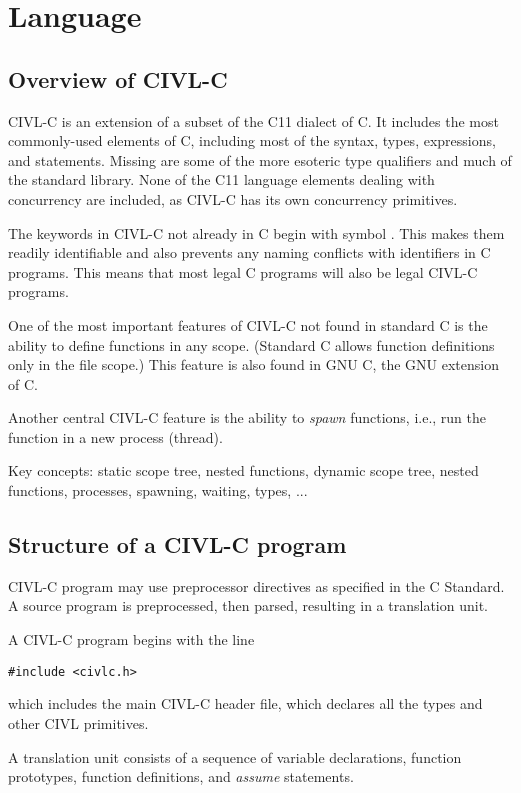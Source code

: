 \part{Language}
\label{part:lang}

\chapter{Overview of CIVL-C}

CIVL-C is an extension of a subset of the C11 dialect of C. It
includes the most commonly-used elements of C, including most of the
syntax, types, expressions, and statements. Missing are some of the
more esoteric type qualifiers and much of the standard library. None
of the C11 language elements dealing with concurrency are included, as
CIVL-C has its own concurrency primitives.

The keywords in CIVL-C not already in C begin with symbol \cckey.
This makes them readily identifiable and also prevents any naming
conflicts with identifiers in C programs.  This means that most
legal C programs will also be legal CIVL-C programs.

One of the most important features of CIVL-C not found in standard C
is the ability to define functions in any scope. (Standard C allows
function definitions only in the file scope.)  This feature is also
found in GNU C, the GNU extension of C.

Another central CIVL-C feature is the ability to \emph{spawn}
functions, i.e., run the function in a new process (thread).




Key concepts: static scope tree, nested functions, dynamic scope tree,
nested functions, processes, spawning, waiting, types, ...


\chapter{Structure of a CIVL-C program}

CIVL-C program may use preprocessor directives as specified in the C
Standard.  A source program is preprocessed, then parsed, resulting
in a translation unit.

A CIVL-C program begins with the line
\begin{verbatim}
#include <civlc.h>
\end{verbatim}
which includes the main CIVL-C header file, which declares all the
types and other CIVL primitives.

A translation unit consists of a sequence of variable declarations,
function prototypes, function definitions, and \emph{assume}
statements.

